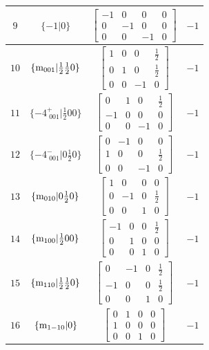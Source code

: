 \documentclass[fleqn,8pt]{jsarticle}
\begin{document}
\begin{longtable}{cccc}
$ 9 $ & $ \{-1|0\} $ & $ \begin{bmatrix} -1 & 0 & 0 & 0 \\ 0 & -1 & 0 & 0 \\ 0 & 0 & -1 & 0 \end{bmatrix} $ & $ -1 $ \\ \hline
$ 10 $ & $ \{{\rm m}_{001}|\frac{1}{2} \frac{1}{2} 0\} $ & $ \begin{bmatrix} 1 & 0 & 0 & \frac{1}{2} \\ 0 & 1 & 0 & \frac{1}{2} \\ 0 & 0 & -1 & 0 \end{bmatrix} $ & $ -1 $ \\ \hline
$ 11 $ & $ \{-4^{+}_{\,\,001}|\frac{1}{2} 0 0\} $ & $ \begin{bmatrix} 0 & 1 & 0 & \frac{1}{2} \\ -1 & 0 & 0 & 0 \\ 0 & 0 & -1 & 0 \end{bmatrix} $ & $ -1 $ \\ \hline
$ 12 $ & $ \{-4^{-}_{\,\,001}|0 \frac{1}{2} 0\} $ & $ \begin{bmatrix} 0 & -1 & 0 & 0 \\ 1 & 0 & 0 & \frac{1}{2} \\ 0 & 0 & -1 & 0 \end{bmatrix} $ & $ -1 $ \\ \hline
$ 13 $ & $ \{{\rm m}_{010}|0 \frac{1}{2} 0\} $ & $ \begin{bmatrix} 1 & 0 & 0 & 0 \\ 0 & -1 & 0 & \frac{1}{2} \\ 0 & 0 & 1 & 0 \end{bmatrix} $ & $ -1 $ \\ \hline
$ 14 $ & $ \{{\rm m}_{100}|\frac{1}{2} 0 0\} $ & $ \begin{bmatrix} -1 & 0 & 0 & \frac{1}{2} \\ 0 & 1 & 0 & 0 \\ 0 & 0 & 1 & 0 \end{bmatrix} $ & $ -1 $ \\ \hline
$ 15 $ & $ \{{\rm m}_{110}|\frac{1}{2} \frac{1}{2} 0\} $ & $ \begin{bmatrix} 0 & -1 & 0 & \frac{1}{2} \\ -1 & 0 & 0 & \frac{1}{2} \\ 0 & 0 & 1 & 0 \end{bmatrix} $ & $ -1 $ \\ \hline
$ 16 $ & $ \{{\rm m}_{1-10}|0\} $ & $ \begin{bmatrix} 0 & 1 & 0 & 0 \\ 1 & 0 & 0 & 0 \\ 0 & 0 & 1 & 0 \end{bmatrix} $ & $ -1 $ \\
\end{longtable}
\end{document}
